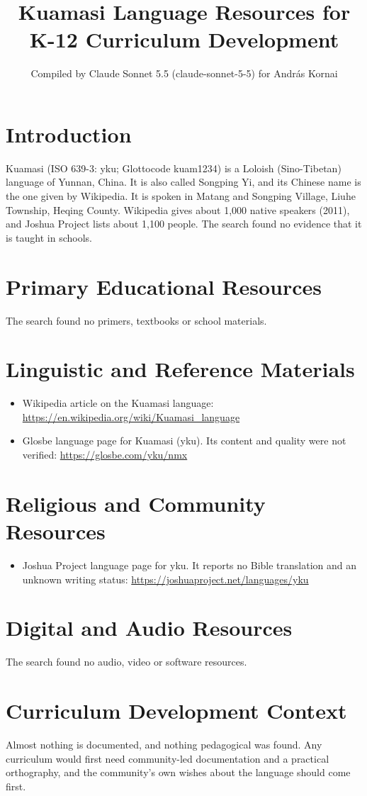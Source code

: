 \documentclass[12pt]{article}
\title{Kuamasi Language Resources for K-12 Curriculum Development}
\author{Compiled by Claude Sonnet 5.5 (claude-sonnet-5-5) for Andr\'as Kornai}
\date{}
\begin{document}
\maketitle

\section{Introduction}
Kuamasi (ISO 639-3: yku; Glottocode kuam1234) is a Loloish (Sino-Tibetan) language of Yunnan, China. It is also called Songping Yi, and its Chinese name is the one given by Wikipedia. It is spoken in Matang and Songping Village, Liuhe Township, Heqing County. Wikipedia gives about 1,000 native speakers (2011), and Joshua Project lists about 1,100 people. The search found no evidence that it is taught in schools.

\section{Primary Educational Resources}
The search found no primers, textbooks or school materials.

\section{Linguistic and Reference Materials}
\begin{itemize}
\item Wikipedia article on the Kuamasi language: \url{https://en.wikipedia.org/wiki/Kuamasi_language}
\item Glosbe language page for Kuamasi (yku). Its content and quality were not verified: \url{https://glosbe.com/yku/nmx}
\end{itemize}

\section{Religious and Community Resources}
\begin{itemize}
\item Joshua Project language page for yku. It reports no Bible translation and an unknown writing status: \url{https://joshuaproject.net/languages/yku}
\end{itemize}

\section{Digital and Audio Resources}
The search found no audio, video or software resources.

\section{Curriculum Development Context}
Almost nothing is documented, and nothing pedagogical was found. Any curriculum would first need community-led documentation and a practical orthography, and the community's own wishes about the language should come first.
\end{document}
